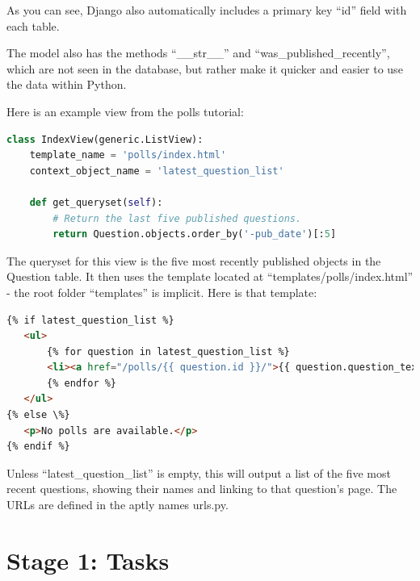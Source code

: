 \documentclass{article}
\begin{document}
As you can see,
Django also automatically includes a primary key ``id'' field with each table.

The model also has the methods ``\_\_str\_\_'' and ``was\_published\_recently'',
which are not seen in the database,
but rather make it quicker and easier to use the data within Python.

Here is an example view from the polls tutorial:
\begin{lstlisting}[language=Python]
class IndexView(generic.ListView):
    template_name = 'polls/index.html'
    context_object_name = 'latest_question_list'

    def get_queryset(self):
        # Return the last five published questions.
        return Question.objects.order_by('-pub_date')[:5]
\end{lstlisting}

The queryset for this view is the five most recently published objects in the Question table.
It then uses the template located at ``templates/polls/index.html'' -
the root folder ``templates'' is implicit.
Here is that template:
\begin{lstlisting}[language=HTML]
{% if latest_question_list %}
   <ul>
       {% for question in latest_question_list %}
       <li><a href="/polls/{{ question.id }}/">{{ question.question_text }}</a></li>
       {% endfor %}
   </ul>
{% else \%}
   <p>No polls are available.</p>
{% endif %}
\end{lstlisting}

Unless ``latest\_question\_list'' is empty,
this will output a list of the five most recent questions,
showing their names and linking to that question's page.
The URLs are defined in the aptly names urls.py.

\section{Stage 1: Tasks}
\end{document}
